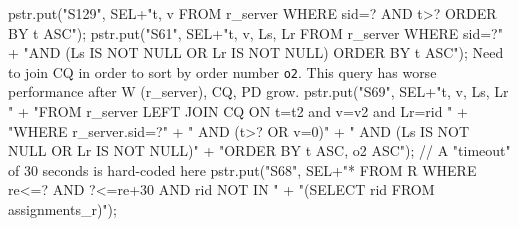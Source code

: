 \documentclass{article}
\def\nwendcode{\endtrivlist \endgroup}      %
\theoremstyle{definition}                   %
\begin{document}
pstr.put("S129", SEL+"t, v FROM r_server WHERE sid=? AND t>? ORDER BY t ASC");
\eatline
{}\nwendcode{}\endmoddef{}
pstr.put("S61", SEL+"t, v, Ls, Lr FROM r_server WHERE sid=?"
      + "AND (Ls IS NOT NULL OR Lr IS NOT NULL) ORDER BY t ASC");
\eatline
{}\nwendcode{}Need to join CQ in order to sort by order number {\tt{}o2}. This query has
worse performance after W (r\_server), CQ, PD grow.
\nwenddocs{}\endmoddef{}
pstr.put("S69", SEL+"t, v, Ls, Lr "
      + "FROM r_server LEFT JOIN CQ ON t=t2 and v=v2 and Lr=rid "
      + "WHERE r_server.sid=?"
      + "   AND (t>? OR v=0)"
      + "   AND (Ls IS NOT NULL OR Lr IS NOT NULL)"
      + "ORDER BY t ASC, o2 ASC");
\eatline
{}\nwendcode{}\endmoddef{}
// A "timeout" of 30 seconds is hard-coded here
pstr.put("S68", SEL+"* FROM R WHERE re<=? AND ?<=re+30 AND rid NOT IN  "
      + "(SELECT rid FROM assignments_r)");
\eatline
{}\nwendcode{}\endmoddef{}
\end{document}
